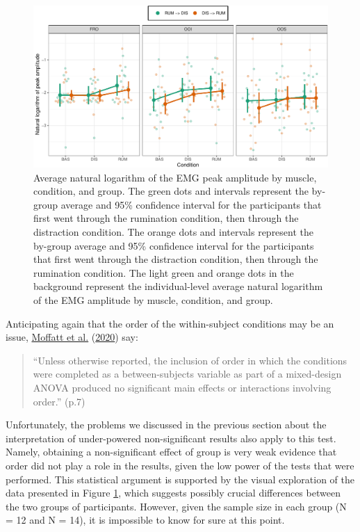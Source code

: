\documentclass[
  english,
  man, donotrepeattitle,floatsintext]{apa6}
\begin{document}
\begin{figure}[!htb]

{\centering \includegraphics[width=1\linewidth]{manuscript_files/figure-latex/order-1} 

}

\caption{Average natural logarithm of the EMG peak amplitude by muscle, condition, and group. The green dots and intervals represent the by-group average and 95\% confidence interval for the participants that first went through the rumination condition, then through the distraction condition. The orange dots and intervals represent the by-group average and 95\% confidence interval for the participants that first went through the distraction condition, then through the rumination condition. The light green and orange dots in the background represent the individual-level average natural logarithm of the EMG amplitude by muscle, condition, and group.}\label{fig:order}
\end{figure}

Anticipating again that the order of the within-subject conditions may be an issue, \protect\hyperlink{ref-moffatt_inner_2020}{Moffatt et al.} (\protect\hyperlink{ref-moffatt_inner_2020}{2020}) say:

\begin{quote}
``Unless otherwise reported, the inclusion of order in which the conditions were completed as a between-subjects variable as part of a mixed-design ANOVA produced no significant main effects or interactions involving order.'' (p.7)
\end{quote}

Unfortunately, the problems we discussed in the previous section about the interpretation of under-powered non-significant results also apply to this test. Namely, obtaining a non-significant effect of group is very weak evidence that order did not play a role in the results, given the low power of the tests that were performed. This statistical argument is supported by the visual exploration of the data presented in Figure \ref{fig:order}, which suggests possibly crucial differences between the two groups of participants. However, given the sample size in each group (N = 12 and N = 14), it is impossible to know for sure at this point.
\end{document}
